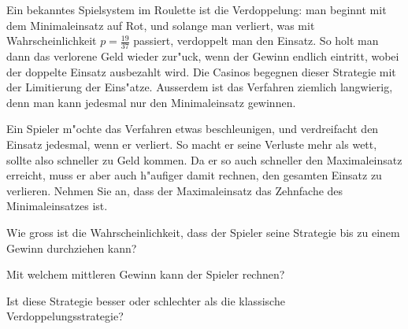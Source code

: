 Ein bekanntes Spielsystem im Roulette ist die Verdoppelung: man beginnt
mit dem Minimaleinsatz auf Rot, und solange man verliert,
was mit Wahrscheinlichkeit $p=\frac{19}{37}$ passiert,
verdoppelt man den Einsatz.
So holt man dann das verlorene Geld wieder zur"uck,
wenn der Gewinn endlich eintritt, wobei der
doppelte Einsatz ausbezahlt wird.
Die Casinos begegnen dieser Strategie mit der Limitierung der Eins"atze.
Ausserdem ist das Verfahren ziemlich langwierig,
denn man kann jedesmal nur den Minimaleinsatz gewinnen.

Ein Spieler m"ochte das Verfahren etwas beschleunigen, und verdreifacht
den Einsatz jedesmal, wenn er verliert. So macht er seine Verluste mehr
als wett, sollte also schneller zu Geld kommen. Da er so auch schneller
den Maximaleinsatz erreicht, muss er aber auch h"aufiger damit rechnen,
den gesamten Einsatz zu verlieren.
Nehmen Sie an, dass der Maximaleinsatz das Zehnfache des Minimaleinsatzes ist.
\begin{teilaufgaben}
\item
Wie gross ist die Wahrscheinlichkeit, dass der Spieler seine Strategie
bis zu einem Gewinn durchziehen kann?
\item
Mit welchem mittleren Gewinn kann der Spieler rechnen?
\item
Ist diese Strategie besser oder schlechter als die klassische
Verdoppelungsstrategie?
\end{teilaufgaben}


